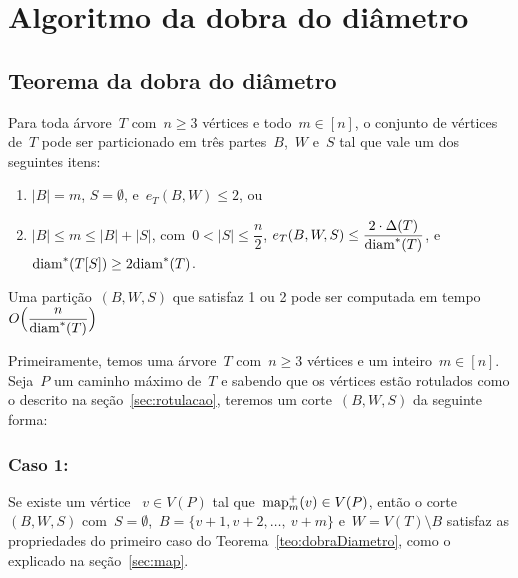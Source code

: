 \section {Algoritmo da dobra do diâmetro}

	\subsection{Teorema da dobra do diâmetro}
	
		\begin{teo}
		\label{teo:dobraDiametro}
			Para toda árvore~$T$ com~$n\ge 3$ vértices e 
			todo~$m\in [n]$,
			o conjunto de vértices de~$T$ pode ser particionado em 
			três partes~$B$,~$W$ e~$S$ tal que vale um dos 
			seguintes itens:
			\begin{enumerate}
				\item ${|B|=m}$, ${S=\emptyset}$, e~${e_T(B,W)\le 2}$, ou
				\item ${|B|\le m\le |B|+|S|}$, 
				com~${0<|S|\le\dfrac{n}{2}}$,
				${e_T(B,W,S)\le \dfrac{2\cdot 
				\Delta(T)}{\mathrm{diam}^*(T)}}$, 
				e~${\mathrm{diam}^*(T[S])\ge 2\mathrm{diam}^*(T)}$.
			\end{enumerate}
			Uma partição~$(B,W,S)$ que satisfaz 1 ou 2 pode ser
			computada em tempo~${O\Big(\dfrac{n}{\mathrm{diam}^*(T)}\Big)}$ 
		\end{teo}

	\bigskip
	\bigskip



		Primeiramente, temos uma árvore~$T$ com~${n\ge 3}$ vértices e um 
		inteiro~${m\in[n]}$.
		Seja~$P$ um caminho máximo de~$T$ e sabendo que os vértices
		estão rotulados como o descrito na seção~\ref{sec:rotulacao},
		teremos um corte~$(B,W,S)$ da seguinte forma:
		\bigskip
		\bigskip
	
	\subsubsection*{Caso 1:}
			Se existe um vértice ~${v\in V(P)}$ tal 
			que~${\mathrm{map}_m^+(v)\in V(P)}$, então o 
			corte~$(B,W,S)$ 
			com~${S=\emptyset}$,~${B =\{v+1, v+2,\ldots,~v+m\}}$
			e~${W=V(T)\setminus B}$ satisfaz as propriedades do
			primeiro caso do Teorema~\ref{teo:dobraDiametro},
			como o explicado na seção~\ref{sec:map}.

